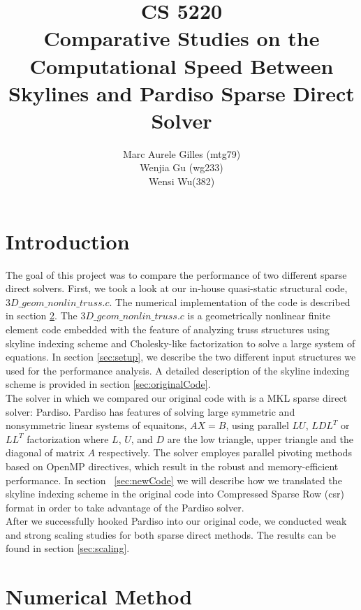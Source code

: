 \documentclass[11pt]{article}
\begin{document}
\title{CS 5220\\ Comparative Studies on the Computational Speed Between Skylines and Pardiso Sparse Direct Solver}
\author{Marc Aurele Gilles (mtg79)\\ Wenjia Gu (wg233)\\Wensi Wu(382) }
\maketitle

\section{Introduction}\label{sec:intro}

The goal of this project was to compare the performance of two different sparse direct solvers. First, we took a look at our in-house quasi-static structural code, $3D\_geom\_nonlin\_truss.c$. The numerical implementation of the code is described in section \ref{sec:method}.  The $3D\_geom\_nonlin\_truss.c $ is a geometrically nonlinear finite element code embedded with the feature of analyzing truss structures using skyline indexing scheme and Cholesky-like factorization to solve a large system of equations. In section \ref{sec:setup}, we describe the two different input structures we used for the performance analysis.  A detailed description of the skyline indexing scheme is provided in section \ref{sec:originalCode}. \\

The solver in which we compared our original code with is a MKL sparse direct solver: Pardiso. Pardiso has features of solving large symmetric and nonsymmetric linear systems of equaitons, $AX=B$, using parallel $LU$, $LDL^T$ or $LL^T$ factorization where $L$, $U$, and $D$ are the low triangle, upper triangle and the diagonal of matrix $A$ respectively. The solver employes parallel pivoting methods based on OpenMP directives, which result in the robust and memory-efficient performance. In section ~\ref{sec:newCode} we will describe how we translated the skyline indexing scheme in the original code into Compressed Sparse Row (csr) format in order to take advantage of the Pardiso solver.\\

After we successfully hooked Pardiso into our original code, we conducted weak and strong scaling studies for both sparse direct methods. The results can be found in section \ref{sec:scaling}.  


\section{Numerical Method}\label{sec:method}
\end{document}
